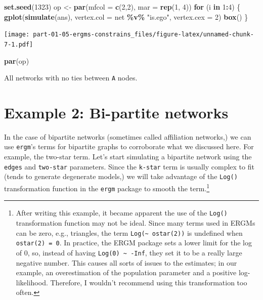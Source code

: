 \documentclass[
]{book}
\newenvironment{Shaded}{\begin{snugshade}}{\end{snugshade}}
\newcommand{\AttributeTok}[1]{\textcolor[rgb]{0.13,0.29,0.53}{#1}}
\newcommand{\ControlFlowTok}[1]{\textcolor[rgb]{0.13,0.29,0.53}{\textbf{#1}}}
\newcommand{\DecValTok}[1]{\textcolor[rgb]{0.00,0.00,0.81}{#1}}
\newcommand{\FunctionTok}[1]{\textcolor[rgb]{0.13,0.29,0.53}{\textbf{#1}}}
\newcommand{\NormalTok}[1]{#1}
\newcommand{\OtherTok}[1]{\textcolor[rgb]{0.56,0.35,0.01}{#1}}
\newcommand{\SpecialCharTok}[1]{\textcolor[rgb]{0.81,0.36,0.00}{\textbf{#1}}}
\newcommand{\StringTok}[1]{\textcolor[rgb]{0.31,0.60,0.02}{#1}}
\begin{document}
\begin{Shaded}
\begin{Highlighting}[]
\FunctionTok{set.seed}\NormalTok{(}\DecValTok{1323}\NormalTok{)}
\NormalTok{op }\OtherTok{\textless{}{-}} \FunctionTok{par}\NormalTok{(}\AttributeTok{mfcol =} \FunctionTok{c}\NormalTok{(}\DecValTok{2}\NormalTok{,}\DecValTok{2}\NormalTok{), }\AttributeTok{mar =} \FunctionTok{rep}\NormalTok{(}\DecValTok{1}\NormalTok{, }\DecValTok{4}\NormalTok{))}
\ControlFlowTok{for}\NormalTok{ (i }\ControlFlowTok{in} \DecValTok{1}\SpecialCharTok{:}\DecValTok{4}\NormalTok{) \{}
  \FunctionTok{gplot}\NormalTok{(}\FunctionTok{simulate}\NormalTok{(ans), }\AttributeTok{vertex.col =}\NormalTok{ net }\SpecialCharTok{\%v\%} \StringTok{"is.ego"}\NormalTok{, }\AttributeTok{vertex.cex =} \DecValTok{2}\NormalTok{)}
  \FunctionTok{box}\NormalTok{()}
\NormalTok{\}}
\end{Highlighting}
\end{Shaded}

\texttt{[image: part-01-05-ergms-constrains\_files/figure-latex/unnamed-chunk-7-1.pdf]}

\begin{Shaded}
\begin{Highlighting}[]
\FunctionTok{par}\NormalTok{(op)}
\end{Highlighting}
\end{Shaded}

All networks with no ties between \texttt{A} nodes.

\hypertarget{example-2-bi-partite-networks}{%
\section{Example 2: Bi-partite networks}\label{example-2-bi-partite-networks}}

In the case of bipartite networks (sometimes called affiliation networks,) we can use \texttt{ergm}'s terms for bipartite graphs to corroborate what we discussed here. For example, the two-star term. Let's start simulating a bipartite network using the \texttt{edges} and \texttt{two-star} parameters. Since the \texttt{k-star} term is usually complex to fit (tends to generate degenerate models,) we will take advantage of the \texttt{Log()} transformation function in the \texttt{ergm} package to smooth the term.\footnote{After writing this example, it became apparent the use of the \texttt{Log()} transformation function may not be ideal. Since many terms used in ERGMs can be zero, e.g., triangles, the term \texttt{Log(\textasciitilde{}\ ostar(2))} is undefined when \texttt{ostar(2)\ =\ 0}. In practice, the ERGM package sets a lower limit for the log of 0, so, instead of having \texttt{Log(0)\ \textasciitilde{}\ -Inf}, they set it to be a really large negative number. This causes all sorts of issues to the estimates; in our example, an overestimation of the population parameter and a positive log-likelihood. Therefore, I wouldn't recommend using this transformation too often.}
\end{document}
